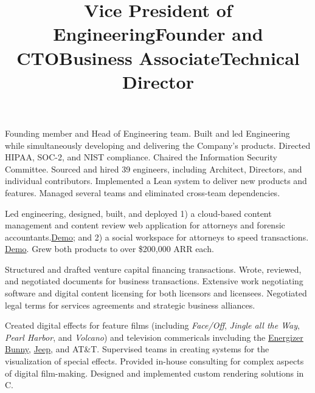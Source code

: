 \documentclass[margin]{res}
\begin{document}
\begin{resume}
\title{\textbf{Vice President of Engineering}}
\begin{position}
\hspace*{.25cm}Founding member and Head of Engineering team. Built and led Engineering while simultaneously developing and delivering the Company's products. Directed HIPAA, SOC-2, and NIST compliance. Chaired the Information Security Committee. Sourced and hired 39 engineers, including Architect, Directors, and individual contributors. Implemented a Lean system to deliver new products and features. Managed several teams and eliminated cross-team dependencies.
\end{position}

\title{\textbf{Founder and CTO}}
\begin{position}
\hspace*{.25cm}Led engineering, designed, built, and deployed 1) a cloud-based content management and content review web application for attorneys and forensic accountants.\href{https://hero.net/public/demo.html}{Demo}; and 2) a social workspace for attorneys to speed transactions. \href{https://hero.net/public/tour.html}{Demo}. Grew both products to over \$200,000 ARR each.
\end{position}

\title{\textbf{Business Associate}}
\begin{position}
\hspace*{.25cm}Structured and drafted venture capital financing transactions. Wrote, reviewed, and negotiated documents for business transactions. Extensive work negotiating software and digital content licensing for both licensors and licensees. Negotiated legal terms for services agreements and strategic business alliances.
\end{position}

\title{\textbf{Technical Director}}
\begin{position}
\hspace*{.25cm}Created digital effects for feature films (including {\it{Face/Off}}, {\it{Jingle all the Way}}, {\it{Pearl Harbor}}, and {\it{Volcano}}) and television commericals invcluding the \href{https://vimeo.com/6690467}{Energizer Bunny}, \href{https://vimeo.com/16943264}{Jeep}, and AT\&T. Supervised teams in creating systems for the visualization of special effects. Provided in-house consulting for complex aspects of digital film-making. Designed and implemented custom rendering solutions in C.
\end{position}



\end{resume}
\end{document}

